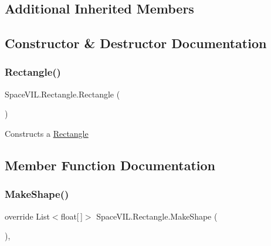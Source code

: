 \subsection*{Additional Inherited Members}


\subsection{Constructor \& Destructor Documentation}
\mbox{\label{class_space_v_i_l_1_1_rectangle_af59c31fe554514fabe70d2f1e97cf9d4}} 
\subsubsection{\texorpdfstring{Rectangle()}{Rectangle()}}
{\footnotesize\ttfamily Space\+V\+I\+L.\+Rectangle.\+Rectangle (\begin{DoxyParamCaption}{ }\end{DoxyParamCaption})\hspace{0.3cm}{\ttfamily [inline]}}



Constructs a \mbox{\hyperlink{class_space_v_i_l_1_1_rectangle}{Rectangle}} 



\subsection{Member Function Documentation}
\mbox{\label{class_space_v_i_l_1_1_rectangle_acc0a5018e266efaa750459bb875eb805}} 
\subsubsection{\texorpdfstring{Make\+Shape()}{MakeShape()}}
{\footnotesize\ttfamily override List$<$float\mbox{[}$\,$\mbox{]}$>$ Space\+V\+I\+L.\+Rectangle.\+Make\+Shape (\begin{DoxyParamCaption}{ }\end{DoxyParamCaption})\hspace{0.3cm}{\ttfamily [inline]}, {\ttfamily [virtual]}}



